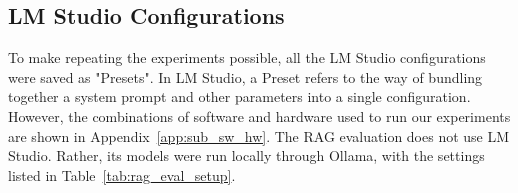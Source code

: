 \documentclass[bdcc,article,submit,pdftex,moreauthors]{Definitions/mdpi}
\begin{document}
\subsection{LM Studio Configurations}
To make repeating the experiments possible, all the LM Studio configurations were saved as "Presets". In LM Studio, a Preset refers to the way of bundling together a system prompt and other parameters into a single configuration.
However, the combinations of software and hardware  used to run our experiments are shown in  Appendix~\ref{app:sub_sw_hw}. %
The RAG evaluation does not use LM Studio. Rather, its models were run locally through Ollama, with the settings listed in Table~\ref{tab:rag_eval_setup}.





\end{document}
